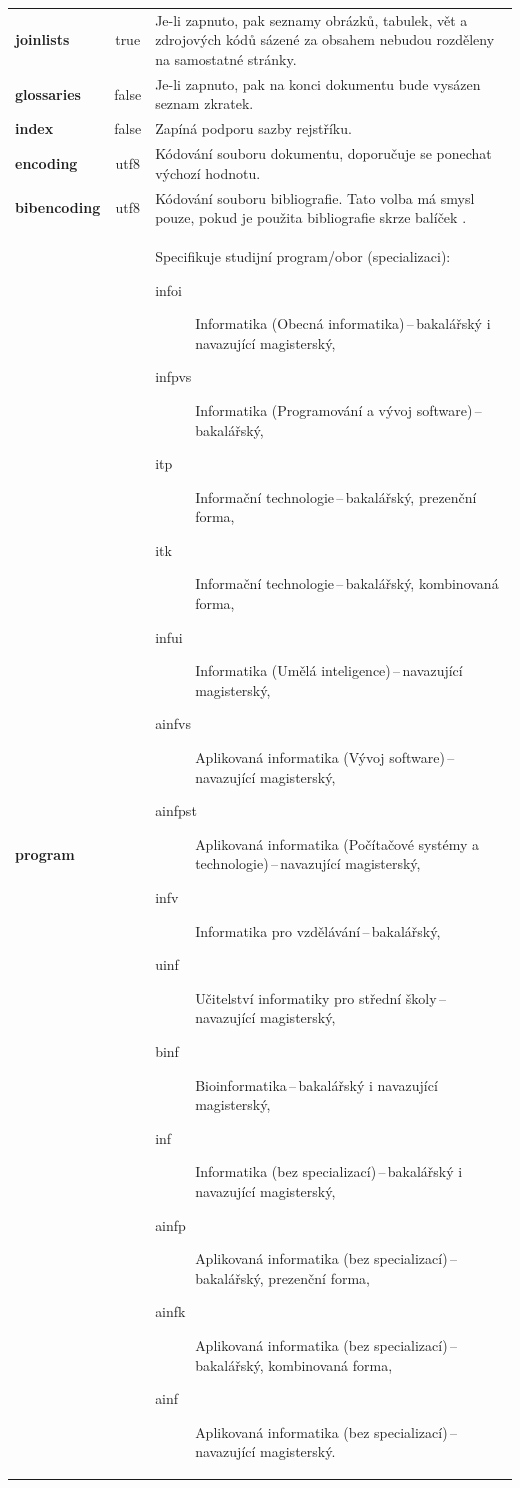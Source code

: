 \documentclass[
  program=itp,
  biblatex,
  figures=false,
  glossaries,
  index
]{kidiplom}
\begin{document}
\begin{center}
\begin{longtable}{>{\bfseries}l >{\ttfamily}c L{8cm}}
joinlists & true & Je-li zapnuto, pak seznamy obrázků, tabulek, vět a
zdrojových kódů sázené za obsahem nebudou rozděleny na samostatné stránky. \\

glossaries & false & Je-li zapnuto, pak na konci dokumentu bude vysázen seznam zkratek. \\

index & false & Zapíná podporu sazby rejstříku. \\

encoding & utf8 & Kódování souboru dokumentu, doporučuje se ponechat výchozí hodnotu. \\

bibencoding & utf8 & Kódování souboru bibliografie. Tato volba má
smysl pouze, pokud je použita bibliografie skrze balíček \BibLaTeX{}. \\

program &  & Specifikuje studijní program/obor (specializaci):\newline
\begin{description}
\item[infoi] Informatika (Obecná informatika)\,--\,bakalářský i navazující magisterský,
\item[infpvs] Informatika (Programování a vývoj software)\,--\,bakalářský,
\item[itp] Informační technologie\,--\,bakalářský, prezenční forma,
\item[itk] Informační technologie\,--\,bakalářský, kombinovaná forma,
\item[infui] Informatika (Umělá inteligence)\,--\,navazující magisterský,
\item[ainfvs] Aplikovaná informatika (Vývoj software)\,--\,navazující magisterský,
\item[ainfpst] Aplikovaná informatika (Počítačové systémy a technologie)\,--\,navazující magisterský,
\item[infv] Informatika pro vzdělávání\,--\,bakalářský,
\item[uinf] Učitelství informatiky pro střední školy\,--\,navazující magisterský,
\item[binf] Bioinformatika\,--\,bakalářský i navazující magisterský,
\item[inf] Informatika (bez specializací)\,--\,bakalářský i navazující magisterský,
\item[ainfp] Aplikovaná informatika (bez specializací)\,--\,bakalářský, prezenční forma,
\item[ainfk] Aplikovaná informatika (bez specializací)\,--\,bakalářský, kombinovaná forma,
\item[ainf] Aplikovaná informatika (bez specializací)\,--\,navazující magisterský.
\end{description}
\end{longtable}
\end{center}
\end{document}
